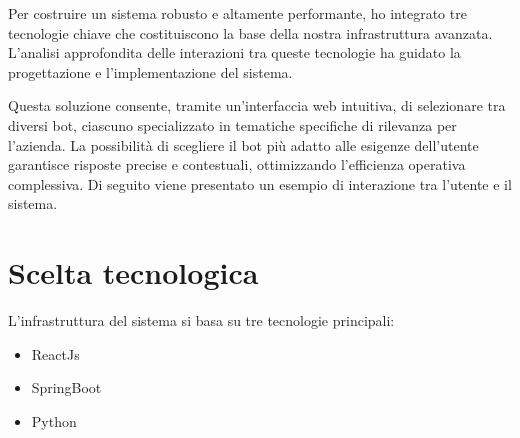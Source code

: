 \documentclass[a4paper,twoside,12pt]{toptesi}
\begin{document}
Per costruire un sistema robusto e altamente performante, ho integrato tre tecnologie chiave che costituiscono la base della nostra infrastruttura avanzata. L'analisi approfondita delle interazioni tra queste tecnologie ha guidato la progettazione e l'implementazione del sistema.

Questa soluzione consente, tramite un'interfaccia web intuitiva, di selezionare tra diversi bot, ciascuno specializzato in tematiche specifiche di rilevanza per l'azienda. La possibilità di scegliere il bot più adatto alle esigenze dell'utente garantisce risposte precise e contestuali, ottimizzando l'efficienza operativa complessiva. Di seguito viene presentato un esempio di interazione tra l'utente e il sistema.

\begin{center}


\end{center}

\section{Scelta tecnologica}

L'infrastruttura del sistema si basa su tre tecnologie principali:

\begin{itemize}
	\item ReactJs
	\item SpringBoot
	\item Python
\end{itemize} 
\end{document}
